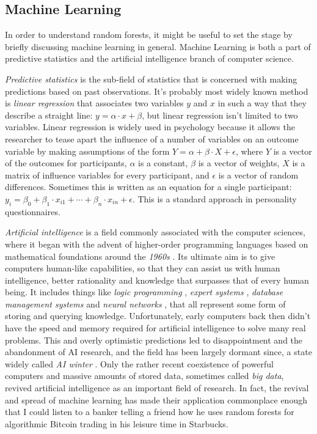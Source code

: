 \documentclass[a4paper,man,12pt,apacite,floatsintext,draftfirst]{apa6} %
\begin{document}
\subsection{Machine Learning}
In order to understand random forests, it might be useful to set
the stage by briefly discussing machine learning in general.
Machine Learning is both a part of predictive statistics and the
artificial intelligence branch of computer science.

\emph{Predictive statistics} is the sub-field of statistics that is
concerned with making predictions based on past observations.
It's probably most widely known method is \emph{linear regression}
\cite{borzlinreg} that associates two variables \(y\) and \(x\) in such a way
that they describe a straight line: \(y = \alpha \cdot x + \beta \), but
linear regression isn't limited to two variables.
Linear regression is widely used in psychology because it
allows the researcher to tease apart the influence of a number of variables on an
outcome variable by making assumptions of the form
\( Y = \alpha + \beta \cdot X + \epsilon \), where \(Y\) is a vector of
the outcomes for participants, \(\alpha\) is a constant,
\(\beta\) is a vector of weights, \(X\) is a matrix of influence variables for
every participant, and \(\epsilon\) is a vector of random differences.
Sometimes this is written as an equation for a single participant:
\( y_{i} = \beta_{0} + \beta_{1} \cdot x_{i1} + \dotsb + \beta_{n} \cdot x_{in} + \epsilon \).
This is a standard approach in personality questionnaires.

\emph{Artificial intelligence} is a field commonly associated with the
computer sciences, where it began with the advent of higher-order
programming languages based on mathematical foundations around the \emph{1960s} \cite{wpHOPL}.
Its ultimate aim is to give computers human-like capabilities,
so that they can assist us with human intelligence, better rationality
and knowledge that surpasses that of every human being.
It includes things like \emph{logic programming} \cite{wpLP, qai},
\emph{expert systems} \cite{wpES, qai}, \emph{database management systems} \cite{wpDB} and
\emph{neural networks} \cite{haykin, qai}, that all represent some form of
storing and querying knowledge.
Unfortunately, early computers back then didn't have the speed and memory
required for artificial intelligence to solve many real problems.
This and overly optimistic predictions led to disappointment and the abandonment of AI research,
and the field has been largely dormant since, a state widely called \emph{AI winter} \cite{qai}.
Only the rather recent coexistence of powerful computers and massive amounts
of stored data, sometimes called \emph{big data}, revived artificial
intelligence as an important field of research.
In fact, the revival and spread of machine learning has made their application
commonplace enough that I could listen to a banker telling a friend how
he uses random forests for algorithmic Bitcoin trading in his leisure time
in Starbucks.
\end{document}
